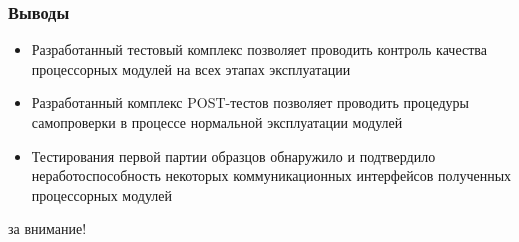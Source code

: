 \documentclass[unicode, notheorems]{beamer}
\begin{document}
\begin{frame}
  \frametitle{Выводы}

  \begin{itemize}
   \item Разработанный тестовый комплекс позволяет проводить контроль качества процессорных модулей на всех этапах эксплуатации
   \item Разработанный комплекс POST-тестов позволяет проводить процедуры самопроверки в процессе нормальной эксплуатации модулей
   \item Тестирования первой партии образцов обнаружило и подтвердило неработоспособность некоторых коммуникационных интерфейсов полученных процессорных модулей
  \end{itemize}

\end{frame}

\begin{frame}
\begin{block}{}
        \center{} за внимание!
\end{block}
\end{frame}
\end{document}
